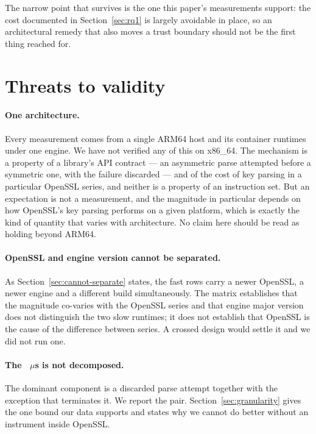 \documentclass[pdflatex,sn-basic,twocolumn]{sn-jnl}%
\begin{document}
The narrow point that survives is the one this paper's measurements support: the
cost documented in Section~\ref{sec:rq1} is largely avoidable in place, so an
architectural remedy that also moves a trust boundary should not be the first
thing reached for.

\section{Threats to validity}\label{sec:threats}

\paragraph{One architecture.} Every measurement comes from a single ARM64 host
and its container runtimes under one engine. We have not verified any of this on
x86\_64. The mechanism is a property of a library's API contract --- an
asymmetric parse attempted before a symmetric one, with the failure discarded ---
and of the cost of key parsing in a particular OpenSSL series, and neither is a
property of an instruction set. But an expectation is not a measurement, and the
magnitude in particular depends on how OpenSSL's key parsing performs on a given
platform, which is exactly the kind of quantity that varies with architecture. No
claim here should be read as holding beyond ARM64.

\paragraph{OpenSSL and engine version cannot be separated.} As
Section~\ref{sec:cannot-separate} states, the fast rows carry a newer OpenSSL, a
newer engine and a different build simultaneously. The matrix establishes that
the magnitude co-varies with the OpenSSL series and that engine major version
does not distinguish the two slow runtimes; it does not establish that OpenSSL is
the cause of the difference between series. A crossed design would settle it and
we did not run one.

\paragraph{The \HostProbeThrows~$\mu$s is not decomposed.} The dominant component
is a discarded parse attempt together with the exception that terminates it. We
report the pair. Section~\ref{sec:granularity} gives the one bound our data
supports and states why we cannot do better without an instrument inside OpenSSL.
\end{document}
